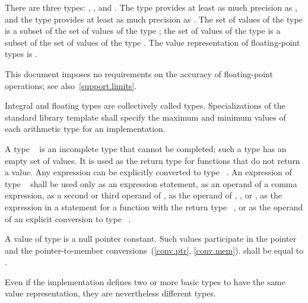 \pnum
There are three  types:
%
,
%
,
and
%
. The type  provides at least as much
precision as , and the type  provides at
least as much precision as . The set of values of the type
 is a subset of the set of values of the type
; the set of values of the type  is a subset
of the set of values of the type . The value
representation of floating-point types is .
%
\begin{note}
This document imposes no requirements on the accuracy of
floating-point operations; see also~\ref{support.limits}.
\end{note}
Integral and floating types are collectively
called  types.
%
Specializations of the standard library template
 shall specify the
maximum and minimum values of each arithmetic type for an
implementation.

\pnum
{}%
A type \cv{}~
is an incomplete type that cannot be completed; such a type has
an empty set of values. It is used as the return
type for functions that do not return a value. Any expression can be
explicitly converted to type \cv{}~.
An expression of type \cv{}~ shall
be used only as an expression statement, as an operand
of a comma expression, as a second or third operand
of , as the operand of
, , or , as
the expression in a  statement for a function
with the return type \cv{}~, or as the operand of an explicit conversion
to type \cv{}~.

\pnum
A value of type  is a null pointer
constant. Such values participate in the pointer and the
pointer-to-member conversions~(\ref{conv.ptr}, \ref{conv.mem}).
 shall be equal to .

\pnum
\begin{note}
Even if the implementation defines two or more basic types to have the
same value representation, they are nevertheless different types.
\end{note}

